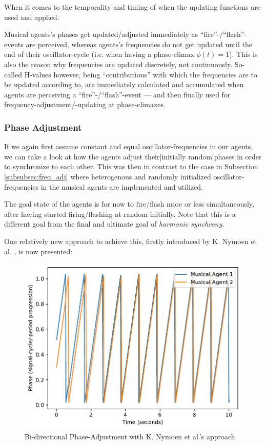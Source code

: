 	When it comes to the temporality and timing of when the updating functions are used and applied:
	
	Musical agents's phases get updated/adjusted immediately as ``fire''-/``flash''-events are perceived, whereas agents's frequencies do not get updated until the end of their oscillator-cycle (i.e. when having a phase-climax $\phi(t)=1$). This is also the reason why frequencies are updated discretely, not continuously. So-called H-values however, being ``contributions'' with which the frequencies are to be updated according to, are immediately calculated and accumulated when agents are perceiving a ``fire''-/``flash''-event — and then finally used for frequency-adjustment/-updating at phase-climaxes.
	
		\subsubsection{Phase Adjustment}
		\label{subsubsec:phase_adj}
			If we again first assume constant and equal oscillator-frequencies in our agents, we can take a look at how the agents adjust their|initially random|phases in order to synchronize to each other. This was then in contrast to the case in Subsection \ref{subsubsec:freq_adj} where heterogenous and randomly initialized oscillator-frequencies in the musical agents are implemented and utilized.
			
			The goal state of the agents is for now to fire/flash more or less simultaneously, after having started firing/flashing at random initially. Note that this is a different goal from the final and ultimate goal of \textit{harmonic synchrony}.
			
			One relatively new approach to achieve this, firstly introduced by K. Nymoen et al. \cite{nymoen_synch}, is now presented:
			
			
			\begin{figure}[h]
				\centering
				\includegraphics[width=0.9\linewidth]{Assets/Figures/NymoenPhaseAdjustment.pdf}
				\caption{Bi-directional Phase-Adjustment with K. Nymoen et al.'s approach}
				\label{fig:nymoen_phase}
			\end{figure}
			
